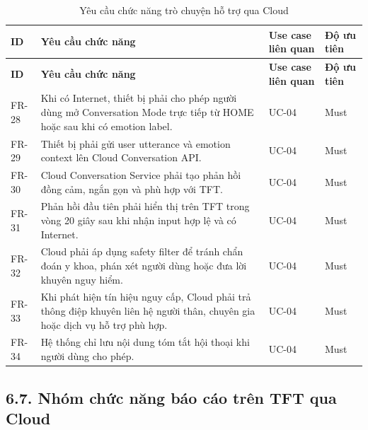 \documentclass[12pt,a4paper]{article}
\begin{document}
\begin{center}
\scriptsize
\begin{longtable}{|P{0.12\textwidth}|P{0.44\textwidth}|P{0.24\textwidth}|P{0.12\textwidth}|}
\caption{Yêu cầu chức năng trò chuyện hỗ trợ qua Cloud}\\
\hline
\textbf{ID} & \textbf{Yêu cầu chức năng} & \textbf{Use case liên quan} & \textbf{Độ ưu tiên} \\
\hline
\endfirsthead
\hline
\textbf{ID} & \textbf{Yêu cầu chức năng} & \textbf{Use case liên quan} & \textbf{Độ ưu tiên} \\
\hline
\endhead
FR-28 & Khi có Internet, thiết bị phải cho phép người dùng mở Conversation Mode trực tiếp từ HOME hoặc sau khi có emotion label. & UC-04 & Must \\
\hline
FR-29 & Thiết bị phải gửi user utterance và emotion context lên Cloud Conversation API. & UC-04 & Must \\
\hline
FR-30 & Cloud Conversation Service phải tạo phản hồi đồng cảm, ngắn gọn và phù hợp với TFT. & UC-04 & Must \\
\hline
FR-31 & Phản hồi đầu tiên phải hiển thị trên TFT trong vòng 20 giây sau khi nhận input hợp lệ và có Internet. & UC-04 & Must \\
\hline
FR-32 & Cloud phải áp dụng safety filter để tránh chẩn đoán y khoa, phán xét người dùng hoặc đưa lời khuyên nguy hiểm. & UC-04 & Must \\
\hline
FR-33 & Khi phát hiện tín hiệu nguy cấp, Cloud phải trả thông điệp khuyên liên hệ người thân, chuyên gia hoặc dịch vụ hỗ trợ phù hợp. & UC-04 & Must \\
\hline
FR-34 & Hệ thống chỉ lưu nội dung tóm tắt hội thoại khi người dùng cho phép. & UC-04 & Must \\
\hline
\end{longtable}
\normalsize
\end{center}

\subsection*{6.7. Nhóm chức năng báo cáo trên TFT qua Cloud}
\end{document}
